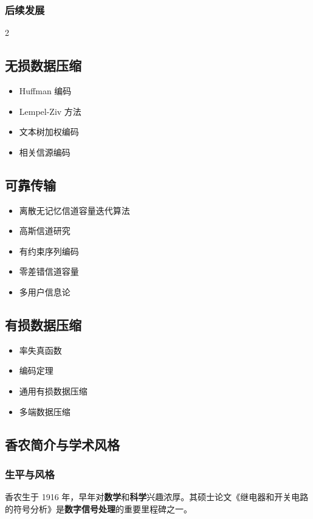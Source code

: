 \subsubsection{后续发展}
\begin{multicols}{2}
\subsection*{无损数据压缩}
\begin{itemize}
  \item Huffman 编码
  \item Lempel-Ziv 方法
  \item 文本树加权编码
  \item 相关信源编码
\end{itemize}

\subsection*{可靠传输}
\begin{itemize}
  \item 离散无记忆信道容量迭代算法
  \item 高斯信道研究
  \item 有约束序列编码
  \item 零差错信道容量
  \item 多用户信息论
\end{itemize}

\subsection*{有损数据压缩}
\begin{itemize}
  \item 率失真函数
  \item 编码定理
  \item 通用有损数据压缩
  \item 多端数据压缩
\end{itemize}
\end{multicols}

\subsection{香农简介与学术风格}

\subsubsection{生平与风格}
香农生于 1916 年，早年对\textbf{数学}和\textbf{科学}兴趣浓厚。其硕士论文《继电器和开关电路的符号分析》是\textbf{数字信号处理}的重要里程碑之一。

